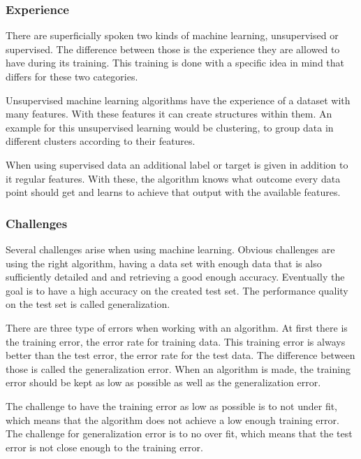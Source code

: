 \documentclass[10pt,a4paper]{report}
\begin{document}
	\subsubsection{Experience}
	
	There are superficially spoken two kinds of machine learning, unsupervised 
	or supervised. The difference between those is the experience they are 
	allowed to have during its training. This training is done with a specific 
	idea in mind that differs for these two 
	categories. \cite{Goodfellow-et-al-2016}
	
	Unsupervised machine learning algorithms have the experience of a dataset 
	with many features. With these features it can create structures within 
	them. An example for this unsupervised learning would be clustering, to 
	group data in different clusters according to their 
	features. \cite{Goodfellow-et-al-2016}
	
	When using supervised data an additional label or target is given in 
	addition to it regular features. With these, the algorithm knows what 
	outcome every data point should get and learns to achieve that output with 
	the available features.  \cite{Goodfellow-et-al-2016}
	
	\subsubsection{Challenges}
	
	Several challenges arise when using machine learning. Obvious challenges 
	are using the right algorithm, having a data set with enough data that is 
	also sufficiently detailed and and retrieving a good enough accuracy. 
	Eventually the goal is to have a high accuracy on the created test set. The 
	performance quality on the test set is called 
	generalization. \cite{Goodfellow-et-al-2016}
	
	
	There are three type of errors when working with an algorithm. At first 
	there is the training error, the error rate for training data. This 
	training error is always better than the test error, the error rate for the 
	test data. The difference between those is called the generalization error. 
	When an algorithm is made, the training error should be kept as low as 
	possible as well as the generalization error. \cite{Goodfellow-et-al-2016}
	
	
	The challenge to have the training error as low as possible is to not under 
	fit, which means that the algorithm does not achieve a low enough training 
	error. The challenge for generalization error is to no over fit, which 
	means that the test error is not close enough to the training 
	error. \cite{Goodfellow-et-al-2016}
	
\end{document}
